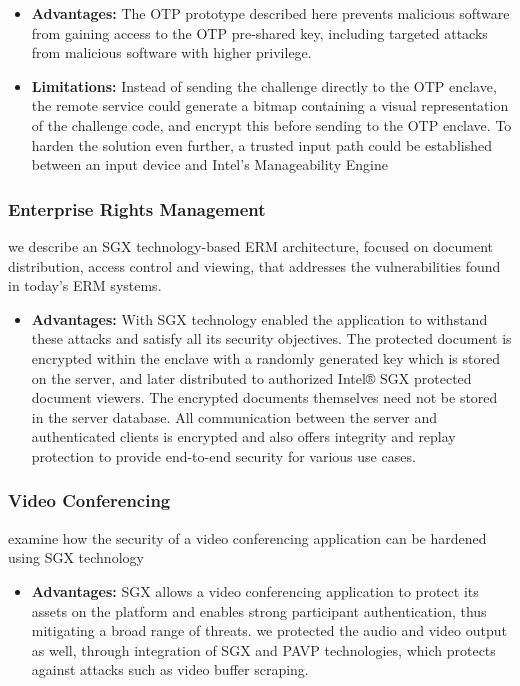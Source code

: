 \documentclass[conference]{IEEEtran}
\begin{document}
\begin{itemize}
    \item \textbf{Advantages:}  The OTP prototype described here prevents malicious software from gaining access to the OTP pre-shared key, including targeted attacks from malicious software with higher privilege.
    \item \textbf{Limitations:} Instead of sending the challenge directly to the OTP enclave, the remote service could generate a bitmap containing a visual representation of the challenge code, and encrypt this before sending to the OTP enclave. To harden the solution even further, a trusted input path could be established between an input device and Intel’s Manageability Engine
\end{itemize}
\subsubsection{Enterprise Rights Management}
we describe an SGX technology-based ERM architecture, focused on document distribution, access control and viewing, that addresses the vulnerabilities found in today’s ERM systems.
\begin{itemize}
    \item \textbf{Advantages:}  With SGX technology enabled the application to withstand these attacks and satisfy all its security objectives. The protected document is encrypted within the enclave with a randomly generated key which is stored on the server, and later distributed to authorized Intel® SGX protected document viewers. The encrypted documents themselves need not be stored in the server database. All communication between the server and authenticated clients is encrypted and also offers integrity and replay protection to provide end-to-end security for various use cases.
\end{itemize}
\subsubsection{Video Conferencing}

examine how the security of a video conferencing application can be hardened using SGX technology
\begin{itemize}
    \item \textbf{Advantages:}  SGX allows a video conferencing application to protect its assets on the platform and enables strong participant authentication, thus mitigating a broad range of threats. we protected the audio and video output as  well, through integration of SGX and PAVP technologies, which protects against attacks such as video buffer scraping.
\end{itemize}
\end{document}
